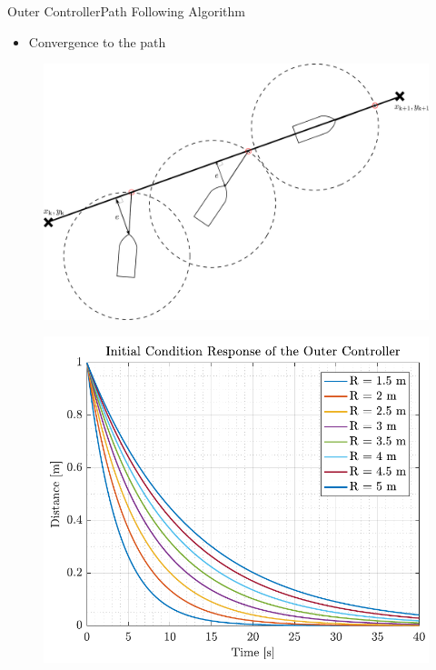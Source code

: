 \begin{frame}{Outer Controller}{Path Following Algorithm}
    \begin{itemize}
        \item Convergence to the path
    \end{itemize}
    \begin{minipage}{0.45\linewidth}
        \begin{figure}[H]
            \centering
            \includegraphics[width=1\linewidth]{figures/patherror}
        \end{figure}     
    \end{minipage}\hfill      
    \begin{minipage}{0.45\linewidth}
        \begin{figure}[H]
            \centering
            \includegraphics[width=1\linewidth]{figures/initCondOuter}
        \end{figure}               
    \end{minipage}\hfill \\
\end{frame}
